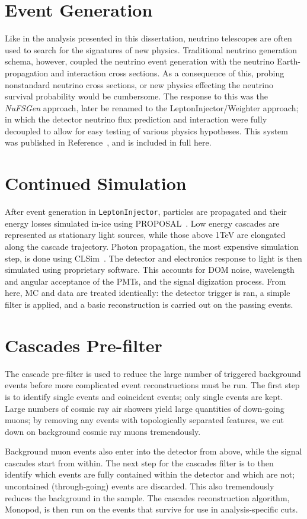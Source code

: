 \documentclass[main.tex]{subfiles}
\begin{document}
\section{Event Generation}

Like in the analysis presented in this dissertation, neutrino telescopes are often used to search for the signatures of new physics. 
Traditional neutrino generation schema, however, coupled the neutrino event generation with the neutrino Earth-propagation and interaction cross sections.
As a consequence of this, probing nonstandard neutrino cross sections, or new physics effecting the neutrino survival probability would be cumbersome. 
The response to this was the \textit{NuFSGen} approach, later be renamed to the LeptonInjector/Weighter approach; in which the detector neutrino flux prediction and interaction were fully decoupled to allow for easy testing of various physics hypotheses. 
This system was published in Reference~\cite{ABBASI2021108018}, and is included in full here.

\section{Continued Simulation}

After event generation in \texttt{LeptonInjector}, particles are propagated and their energy losses simulated in-ice using PROPOSAL~\cite{Koehne:2013gpa}.
Low energy cascades are represented as stationary light sources, while those above 1TeV are elongated along the cascade trajectory. 
Photon propagation, the most expensive simulation step, is done using CLSim~\cite{CLSim}. 
The detector and electronics response to light is then simulated using proprietary software. 
This accounts for DOM noise, wavelength and angular acceptance of the PMTs, and the signal digization process.
From here, MC and data are treated identically: the detector trigger is ran, a simple filter is applied, and a basic reconstruction is carried out on the passing events. 

\section{Cascades Pre-filter}\label{sec:level3}

The cascade pre-filter is used to reduce the large number of triggered background events before more complicated event reconstructions must be run. 
The first step is to identify single events and coincident events; only single events are kept. 
Large numbers of cosmic ray air showers yield large quantities of down-going muons; by removing any events with topologically separated features, we cut down on background cosmic ray muons tremendously. 

Background muon events also enter into the detector from above, while the signal cascades start from within.
The next step for the cascades filter is to then identify which events are fully contained within the detector and which are not; uncontained (through-going) events are discarded. 
This also tremendously reduces the background in the sample. 
The cascades reconstruction algorithm, Monopod, is then run on the events that survive for use in analysis-specific cuts.


\end{document}
